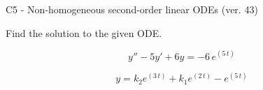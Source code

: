 \begin{exercise}
  \begin{exerciseTitle}C5 - Non-homogeneous second-order linear ODEs (ver. 43)\end{exerciseTitle}
  \begin{exerciseStatement}
    
Find the solution to the given ODE.

    
\[y''-5y'+6y = -6 \, e^{\left(5 \, t\right)}\]

  \end{exerciseStatement}
  \begin{exerciseAnswer}
    
\[y= k_{2} e^{\left(3 \, t\right)} + k_{1} e^{\left(2 \, t\right)} - e^{\left(5 \, t\right)}\]

  \end{exerciseAnswer}
\end{exercise}